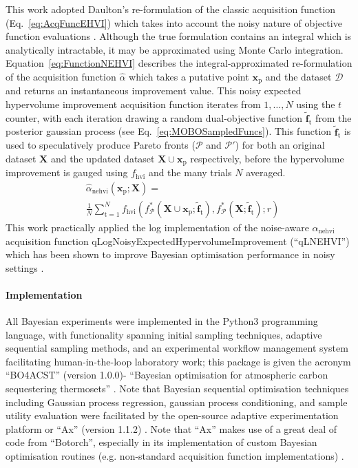 This work adopted Daulton's re-formulation of the classic acquisition
 function (Eq.~\ref{eq:AcqFuncEHVI}) which takes into account the noisy
 nature of objective function evaluations \autocite{Daulton2021}. 
Although the true formulation contains an integral which is analytically
 intractable, it may be approximated using Monte Carlo integration.
Equation~\ref{eq:FunctionNEHVI} describes the integral-approximated 
 re-formulation of the acquisition function \(\hat{\alpha}\) which takes a
 putative point \(\mathbf{x}_{\mathrm{p}}\) and the dataset \(\mathcal{D}\) and
 returns an instantaneous improvement value.
This noisy expected hypervolume improvement acquisition function
 iterates from \(1,\dots,N\) using the \(t\) counter, with each iteration
 drawing a random dual-objective function \(\tilde{\mathbf{f}}_{\mathrm{t}}\) from
 the posterior gaussian process (see Eq.~\ref{eq:MOBOSampledFuncs}).
This function \(\tilde{\mathbf{f}}_{\mathrm{t}}\) is used to speculatively produce
 Pareto fronts (\(\mathcal{P}\) and \(\mathcal{P}'\)) for both an original
 dataset \(\mathbf{X}\) and the updated dataset
 \(\mathbf{X}\cup\mathbf{x}_{\mathrm{p}}\) respectively, before the hypervolume
 improvement is gauged using \(f_{\mathrm{hvi}}\) and the many trials \(N\) averaged.
\small
\begin{equation}\label{eq:FunctionNEHVI}
    \begin{split}
        &\hat{\alpha}_{\mathrm{nehvi}}(\mathbf{x}_{\mathrm{p}};\mathbf{X})=\\
        &\frac{1}{N}\sum_{\mathrm{t}=1}^{N}f_{\mathrm{hvi}}(f_{\mathcal{P}}^{*}(\mathbf{X}\cup\mathbf{x}_{\mathrm{p}};\tilde{\mathbf{f}}_{\mathrm{t}}),f_{\mathcal{P}}^{*}(\mathbf{X};\tilde{\mathbf{f}}_{\mathrm{t}});r)
    \end{split}
\end{equation}
\normalsize
This work practically applied the log implementation of the noise-aware
 \(\alpha_{\mathrm{nehvi}}\) acquisition function
 qLogNoisyExpectedHypervolumeImprovement (``qLNEHVI'') which has been shown 
 to improve Bayesian optimisation performance in noisy settings
 \autocite{Daulton2021}. 

\paragraph{Implementation}
All Bayesian experiments were implemented in the Python3 programming language, with
 functionality spanning initial sampling techniques,
 adaptive sequential sampling methods, and an experimental workflow
 management system facilitating human-in-the-loop laboratory work; this
 package is given the acronym ``BO4ACST'' (version 1.0.0)- ``Bayesian
 optimisation for atmospheric carbon sequestering thermosets''
 \autocite{HojlundDodd2025}.
Note that Bayesian sequential optimisation techniques including Gaussian
 process regression, gaussian process conditioning, and sample utility
 evaluation were facilitated by the open-source adaptive experimentation
 platform or ``Ax'' (version 1.1.2) \autocite{Facebook2025}.
Note that ``Ax'' makes use of a great deal of code from ``Botorch'',
 especially in its implementation of custom Bayesian optimisation routines
 (e.g. non-standard acquisition function implementations)
 \autocite{MetaPytorch2025B}.